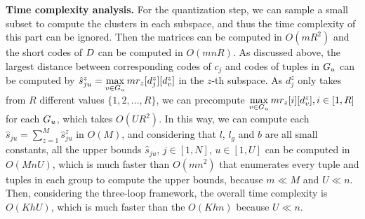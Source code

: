  
 
 
 
 

 
 
 \noindent \textbf{Time complexity analysis.}
 For the quantization step, we can sample a small subset to compute the clusters in each subspace, and thus the time complexity of this part can be ignored. 
 Then the matrices can be computed in $O(mR^2)$ and the short codes of $D$ can be computed in $O(mnR)$. 
 As discussed above,  the largest distance between corresponding codes of  $c_j$ and codes of tuples in $G_u$ can be computed by $\hat{s}_{ju}^z = \max\limits_{v\in G_u}mr_z[d_{j}^z][d_v^z]$ in the $z$-th subspace. 
 As $d_j^z$ only takes from $R$ different values $\{1, 2, \dots, R\}$, we can precompute $\max\limits_{v\in G_u}mr_z[i][d_v^z], i\in[1, R]$ for each $G_u$, which takes $O(UR^2)$. In this way, we can compute each $\hat{s}_{ju}=\sum_{z=1}^{M}\hat{s}^z_{ju}$ in $O(M)$, and considering that $l$, $l_g$ and  $b$ are all small constants, all the upper bounds $\hat{s}_{ju}$, $j\in [1,N]$, $u\in [1,U]$ can be computed in  $O(MnU)$, which is much faster than $O(mn^2)$ that enumerates every tuple and tuples in each group to compute the upper bounds, because $m \ll M$ and $U \ll n$. %
 Then, 
 considering the three-loop framework, the overall time complexity is $O(KhU)$, which is much faster than the $O(Khn)$ because $U \ll n$.
%
 
